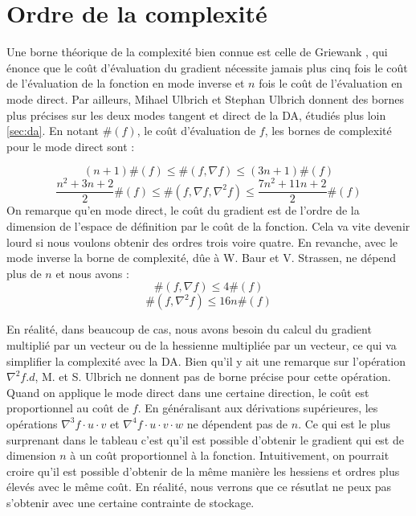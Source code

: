 \section{Ordre de la complexit\'e}
\label{chap1:ordre}
Une borne th\'eorique de la complexit\'e bien connue est celle de Griewank \cite{Iri89onautomatic}, qui \'enonce que 
le coût d'\'evaluation du gradient n\'ecessite jamais plus cinq fois le coût de l'\'evaluation
de la fonction en mode inverse et $n$ fois le coût de l'\'evaluation en mode direct.
Par ailleurs, Mihael Ulbrich et Stephan Ulbrich \cite{Ulbrich} donnent des bornes plus pr\'ecises sur les deux modes tangent et direct
de la DA, \'etudi\'es plus loin \ref{sec:da}.
En notant $\#(f)$, le coût d'\'evaluation de $f$, les bornes de complexit\'e pour le mode direct sont :

$$(n+1)\#(f) \leq \#(f,\nabla f)\leq (3n+1)\#(f)$$
$$\frac{n^2+3n+2}{2}\#(f) \leq \#(f,\nabla f,\nabla^2f)\leq \frac{7n^2+11n+2}{2}\#(f)$$
%
On remarque qu'en mode direct, le coût du gradient est de l'ordre de la dimension de l'espace de d\'efinition par le coût de la fonction.
Cela va vite devenir lourd si nous voulons obtenir des ordres trois voire quatre.
En revanche, avec le mode inverse la borne de complexit\'e, dûe \`a W. Baur et V. Strassen\cite{Baur}, ne d\'epend plus de $n$ et nous avons :
\begin{equation*}
\#(f,\nabla f)\leq 4\#(f)
\end{equation*}
\begin{equation*}
\#(f,\nabla^2 f)\leq 16n\#(f)
\end{equation*}


En r\'ealit\'e, dans beaucoup de cas, nous avons besoin du calcul du gradient multipli\'e par un vecteur ou de la hessienne multipli\'ee par un vecteur, ce qui va simplifier la 
complexit\'e avec la DA.
Bien qu'il y ait une remarque sur l'op\'eration $\nabla^2 f.d $, M. et S. Ulbrich ne donnent pas de borne pr\'ecise pour cette op\'eration.
Quand on applique le mode direct dans une certaine direction, le coût est proportionnel au coût de $f$. En g\'en\'eralisant aux d\'erivations
sup\'erieures, les op\'erations $\nabla^3 f\cdot u \cdot v$ et $\nabla^4 f\cdot u \cdot v \cdot w$ ne d\'ependent pas de $n$. Ce qui est 
le plus surprenant dans le tableau c'est qu'il est possible d'obtenir le gradient qui est de dimension $n$ \`a un coût proportionnel \`a
la fonction. Intuitivement, on pourrait croire qu'il est possible d'obtenir de la même mani\`ere les hessiens et ordres plus \'elev\'es avec 
le même coût. En r\'ealit\'e, nous verrons que ce r\'esutlat ne peux pas s'obtenir avec une certaine contrainte de stockage.

